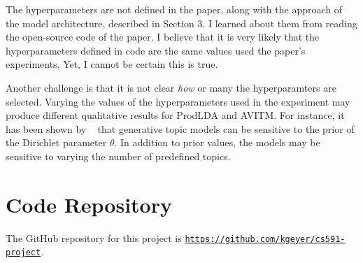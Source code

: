 \documentclass[10pt,twocolumn,letterpaper]{article}
\begin{document}
The hyperparameters are not defined in the paper, along with the approach of the model architecture, described in Section 3.
I learned about them from reading the open-source code of the paper.
I believe that it is very likely that the hyperparameters defined in code are the same values used the paper's experiments.
Yet, I cannot be certain this is true.

Another challenge is that it is not clear \textit{how} or  many the hyperparamters are selected. 
Varying the values of the hyperparameters used in the experiment may produce different qualitative results for ProdLDA and AVITM.
For instance, it has been shown by ~\cite{wallach2009rethinking} that generative topic models can be sensitive to the prior of the Dirichlet parameter $\theta$.
In addition to prior values, the models may be sensitive to varying the number of predefined topics.

\section{Code Repository}
The GitHub repository for this project is \href{https://github.com/kgeyer/cs591-project}{\texttt{https://github.com/kgeyer/cs591-project}}.

{\small


}

\end{document}
